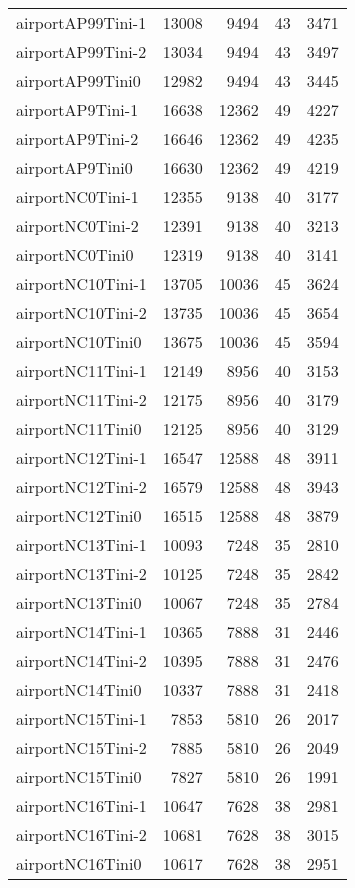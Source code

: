 \begin{tabular}{lrrrr}
airportAP99Tini-1 & 13008 & 9494 & 43 & 3471 \\
airportAP99Tini-2 & 13034 & 9494 & 43 & 3497 \\
airportAP99Tini0 & 12982 & 9494 & 43 & 3445 \\
airportAP9Tini-1 & 16638 & 12362 & 49 & 4227 \\
airportAP9Tini-2 & 16646 & 12362 & 49 & 4235 \\
airportAP9Tini0 & 16630 & 12362 & 49 & 4219 \\
airportNC0Tini-1 & 12355 & 9138 & 40 & 3177 \\
airportNC0Tini-2 & 12391 & 9138 & 40 & 3213 \\
airportNC0Tini0 & 12319 & 9138 & 40 & 3141 \\
airportNC10Tini-1 & 13705 & 10036 & 45 & 3624 \\
airportNC10Tini-2 & 13735 & 10036 & 45 & 3654 \\
airportNC10Tini0 & 13675 & 10036 & 45 & 3594 \\
airportNC11Tini-1 & 12149 & 8956 & 40 & 3153 \\
airportNC11Tini-2 & 12175 & 8956 & 40 & 3179 \\
airportNC11Tini0 & 12125 & 8956 & 40 & 3129 \\
airportNC12Tini-1 & 16547 & 12588 & 48 & 3911 \\
airportNC12Tini-2 & 16579 & 12588 & 48 & 3943 \\
airportNC12Tini0 & 16515 & 12588 & 48 & 3879 \\
airportNC13Tini-1 & 10093 & 7248 & 35 & 2810 \\
airportNC13Tini-2 & 10125 & 7248 & 35 & 2842 \\
airportNC13Tini0 & 10067 & 7248 & 35 & 2784 \\
airportNC14Tini-1 & 10365 & 7888 & 31 & 2446 \\
airportNC14Tini-2 & 10395 & 7888 & 31 & 2476 \\
airportNC14Tini0 & 10337 & 7888 & 31 & 2418 \\
airportNC15Tini-1 & 7853 & 5810 & 26 & 2017 \\
airportNC15Tini-2 & 7885 & 5810 & 26 & 2049 \\
airportNC15Tini0 & 7827 & 5810 & 26 & 1991 \\
airportNC16Tini-1 & 10647 & 7628 & 38 & 2981 \\
airportNC16Tini-2 & 10681 & 7628 & 38 & 3015 \\
airportNC16Tini0 & 10617 & 7628 & 38 & 2951 \\

\end{tabular}
